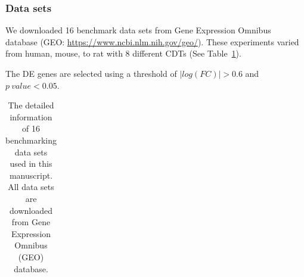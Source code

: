 \subsubsection{Data sets}
We downloaded 16 benchmark data sets from Gene Expression Omnibus database (GEO: \url{https://www.ncbi.nlm.nih.gov/geo/}). 
These experiments varied from human, mouse, to rat with 8 different CDTs (See Table~\ref{Datasets}).

The DE genes are selected using a threshold of $|log(FC)| > 0.6$ and $p\ value < 0.05$.


\begin{table}
\caption{The detailed information of 16 benchmarking data sets used in this manuscript. All data sets are downloaded from Gene Expression Omnibus (GEO) database.}
\label{Datasets} 
\begin{center}
\scriptsize
\begin{tabular}{ c|cccc } 


\end{tabular}
\end{center}
\end{table}
